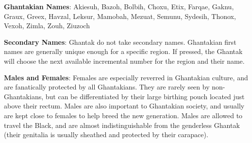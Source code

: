 \textbf{Ghantakian Names}: Akiesuh, Bazoh, Bolbih, Choxu, Etix, Farqae, Gaknu, Graux, Greex, Havzal, Leksur, Mamobah, Mezuat, Semunu, Sydesih, Thonox, Vexoh, Zimla, Zouh, Ziuzoch

\textbf{Secondary Names}: Ghantak do not take secondary names. Ghantakian first names are generally unique enough for a specific region. If pressed, the Ghantak will choose the next available incremental number for the region and their name.

\textbf{Males and Females}: Females are especially reverred in Ghantakian culture, and are fanatically protected by all Ghantakians. They are rarely seen by non-Ghantakians, but can be differentiated by their large birthing pouch located just above their rectum. Males are also important to Ghantakian society, and usually are kept close to females to help breed the new generation. Males are allowed to travel the Black, and are almost indistinguishable from the genderless Ghantak (their genitalia is usually sheathed and protected by their carapace).

